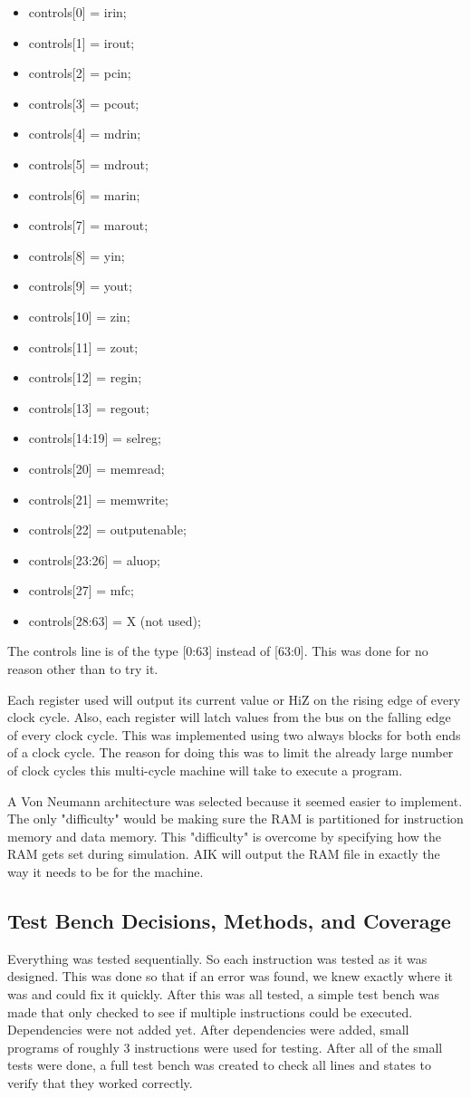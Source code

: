 \documentclass[conference]{IEEEtran}
\begin{document}
\begin{itemize}
\item controls[0] = irin;
\item controls[1] = irout;
\item controls[2] = pcin;
\item controls[3] = pcout;
\item controls[4] = mdrin;
\item controls[5] = mdrout;
\item controls[6] = marin;
\item controls[7] = marout;
\item controls[8] = yin;
\item controls[9] = yout;
\item controls[10] = zin;
\item controls[11] = zout;
\item controls[12] = regin;
\item controls[13] = regout;
\item controls[14:19] = selreg;
\item controls[20] = memread;
\item controls[21] = memwrite;
\item controls[22] = outputenable;
\item controls[23:26] = aluop;
\item controls[27] = mfc;
\item controls[28:63] = X (not used);
\end{itemize}
The controls line is of the type [0:63] instead of [63:0].
This was done for no reason other than to try it.

Each register used will output its current value or HiZ on the rising edge of every clock cycle.
Also, each register will latch values from the bus on the falling edge of every clock cycle.
This was implemented using two always blocks for both ends of a clock cycle. 
The reason for doing this was to limit the already large number of clock cycles this multi-cycle machine will take to execute a program.

A Von Neumann architecture was selected because it seemed easier to implement.
The only "difficulty" would be making sure the RAM is partitioned for instruction memory and data memory.
This "difficulty" is overcome by specifying how the RAM gets set during simulation.
AIK will output the RAM file in exactly the way it needs to be for the machine.


\subsection{Test Bench Decisions, Methods, and Coverage}
Everything was tested sequentially. So each instruction was tested as it was designed. This was done so that if an error was found, we knew exactly where it was and could fix it quickly. After this was all tested, a simple test bench was made that only checked to see if multiple instructions could be executed. Dependencies were not added yet. After dependencies were added, small programs of roughly 3 instructions were used for testing. After all of the small tests were done, a full test bench was created to check all lines and states to verify that they worked correctly. 
\end{document}
